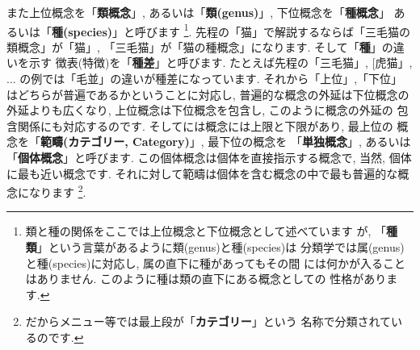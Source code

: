 また上位概念を「\textbf{類概念}」, あるいは「\textbf{類(genus)}」,
 下位概念を「\textbf{種概念}」 あるいは「\textbf{種(species)}」と呼びます
\footnote{類と種の関係をここでは上位概念と下位概念として述べています
が, 「\textbf{種類}」という言葉があるように類(genus)と種(species)は
分類学では属(genus)と種(species)に対応し, 属の直下に種があってもその間
には何かが入ることはありません. このように種は類の直下にある概念としての
性格があります.}. 先程の「猫」で解説するならば「三毛猫の類概念」が「猫」,
「三毛猫」が「猫の種概念」になります. そして「\textbf{種}」の違いを示す
徴表(特徴)を「\textbf{種差}」と呼びます. たとえば先程の「三毛猫」, [虎猫」,
... の例では「毛並」の違いが種差になっています. それから「上位」,「下位」
はどちらが普遍であるかということに対応し, 普遍的な概念の外延は下位概念の
外延よりも広くなり, 上位概念は下位概念を包含し, このように概念の外延の
包含関係にも対応するのです. そしてには概念には上限と下限があり, 最上位の
概念を「\textbf{範疇(カテゴリー, Category)}」, 最下位の概念を
「\textbf{単独概念}」, あるいは「\textbf{個体概念}」と呼びます.
 この個体概念は個体を直接指示する概念で, 当然, 個体に最も近い概念です.
 それに対して範疇は個体を含む概念の中で最も普遍的な概念になります
\footnote{だからメニュー等では最上段が「\textbf{カテゴリー}」という
名称で分類されているのです.}.
\newline


